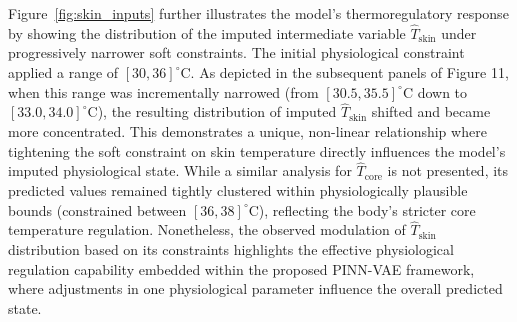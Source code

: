 Figure~\ref{fig:skin_inputs} further illustrates the model's thermoregulatory response by showing the distribution of the imputed intermediate variable $\hat{T}_{\text{skin}}$ under progressively narrower soft constraints. The initial physiological constraint applied a range of $[30, 36]^{\circ}$C. As depicted in the subsequent panels of Figure 11, when this range was incrementally narrowed (from $[30.5, 35.5]^{\circ}$C down to $[33.0, 34.0]^{\circ}$C), the resulting distribution of imputed $\hat{T}_{\text{skin}}$ shifted and became more concentrated. This demonstrates a unique, non-linear relationship where tightening the soft constraint on skin temperature directly influences the model's imputed physiological state. While a similar analysis for $\hat{T}_{\text{core}}$ is not presented, its predicted values remained tightly clustered within physiologically plausible bounds (constrained between $[36, 38]^{\circ}$C), reflecting the body's stricter core temperature regulation. Nonetheless, the observed modulation of $\hat{T}_{\text{skin}}$ distribution based on its constraints highlights the effective physiological regulation capability embedded within the proposed PINN-VAE framework, where adjustments in one physiological parameter influence the overall predicted state.